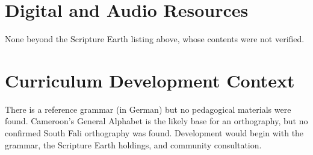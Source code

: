 \documentclass[12pt]{article}
\begin{document}
\section{Digital and Audio Resources}
None beyond the Scripture Earth listing above, whose contents were not verified.

\section{Curriculum Development Context}
There is a reference grammar (in German) but no pedagogical materials were found. Cameroon's General Alphabet is the likely base for an orthography, but no confirmed South Fali orthography was found. Development would begin with the grammar, the Scripture Earth holdings, and community consultation.
\end{document}
